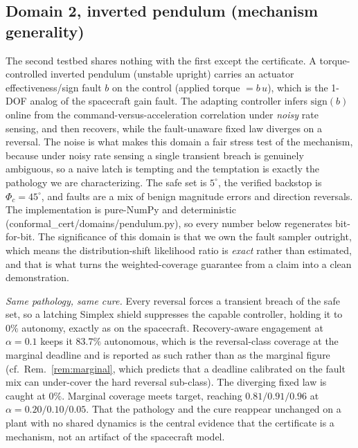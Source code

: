 \documentclass[11pt]{article}
\theoremstyle{plain}
\theoremstyle{definition}
\begin{document}

\subsection{Domain 2, inverted pendulum (mechanism generality)}
The second testbed shares nothing with the first except the certificate. A torque-controlled
inverted pendulum (unstable upright) carries an actuator
effectiveness/sign fault $b$ on the control (applied torque $=b\,u$), which is the 1-DOF
analog of the spacecraft gain fault. The adapting controller infers $\mathrm{sign}(b)$ online
from the command-versus-acceleration correlation under \emph{noisy} rate sensing, and then
recovers, while the fault-unaware fixed law diverges on a reversal. The noise is what makes
this domain a fair stress test of the mechanism, because under noisy rate sensing a single
transient breach is genuinely ambiguous, so a naive latch is tempting and the temptation is
exactly the pathology we are characterizing. The safe set is $5^\circ$, the verified backstop
is $\Phi_c=45^\circ$, and faults are a mix of benign magnitude errors and direction
reversals. The implementation is pure-NumPy and deterministic
(conformal\_cert/domains/pendulum.py), so every number below regenerates bit-for-bit. The
significance of this domain is that we own the fault sampler outright, which means the
distribution-shift likelihood ratio is \emph{exact} rather than estimated, and that is what
turns the weighted-coverage guarantee from a claim into a clean demonstration.

\emph{Same pathology, same cure.} Every reversal forces a transient breach of the safe set,
so a latching Simplex shield suppresses the capable controller, holding it to $0\%$ autonomy,
exactly as on the spacecraft. Recovery-aware engagement at $\alpha=0.1$ keeps it $83.7\%$
autonomous, which is the reversal-class coverage at the marginal deadline and is reported as
such rather than as the marginal figure (cf.\ Rem.~\ref{rem:marginal}, which predicts that a
deadline calibrated on the fault mix can under-cover the hard reversal sub-class). The
diverging fixed law is caught at $0\%$. Marginal coverage meets target, reaching
$0.81/0.91/0.96$ at $\alpha=0.20/0.10/0.05$. That the pathology and the cure reappear
unchanged on a plant with no shared dynamics is the central evidence that the certificate is
a mechanism, not an artifact of the spacecraft model.
\end{document}

